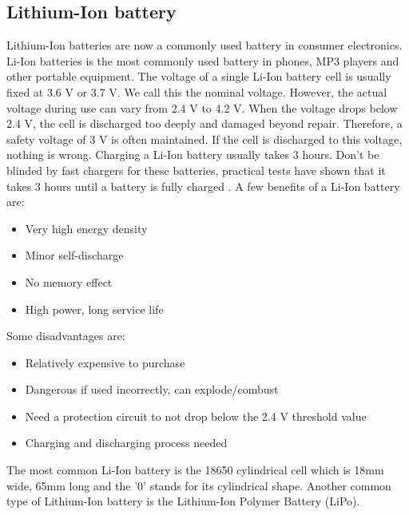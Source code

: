\documentclass[11pt,a4paper]{article}
\begin{document}
\subsection{Lithium-Ion battery}\label{sec:liIon}
Lithium-Ion batteries are now a commonly used battery in consumer electronics. Li-Ion batteries is the most commonly used battery in phones, MP3 players and other portable equipment. The voltage of a single Li-Ion battery cell is usually fixed at 3.6 V or 3.7 V. We call this the nominal voltage. However, the actual voltage during use can vary from 2.4 V to 4.2 V. When the voltage drops below 2.4 V, the cell is discharged too deeply and damaged beyond repair. Therefore, a safety voltage of 3 V is often maintained. If the cell is discharged to this voltage, nothing is wrong. Charging a Li-Ion battery usually takes 3 hours. Don't be blinded by fast chargers for these batteries, practical tests have shown that it takes 3 hours until a battery is fully charged \cite{LiIon_ledscherp}. A few benefits of a Li-Ion battery are:
\begin{itemize}
	\item Very high energy density
	\item Minor self-discharge
	\item No memory effect
	\item High power, long service life
\end{itemize}
Some disadvantages are:
\begin{itemize}
	\item Relatively expensive to purchase
	\item Dangerous if used incorrectly, can explode/combust
	\item Need a protection circuit to not drop below the 2.4 V threshold value
	\item Charging and discharging process needed 
\end{itemize}
The most common Li-Ion battery is the 18650 cylindrical cell which is 18mm wide, 65mm long and the '0' stands for its cylindrical shape. Another common type of Lithium-Ion battery is the Lithium-Ion Polymer Battery (LiPo).
\end{document}
